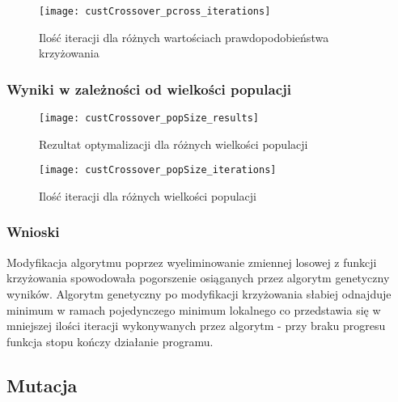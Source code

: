 \begin{figure}[H]
	\centering
	\texttt{[image: custCrossover\_pcross\_iterations]}
	\caption{Ilość iteracji dla różnych wartościach prawdopodobieństwa krzyżowania}
\end{figure}


\subsubsection{Wyniki w zależności od wielkości populacji}

\begin{figure}[H]
	\centering
	\texttt{[image: custCrossover\_popSize\_results]}
	\caption{Rezultat optymalizacji dla różnych wielkości populacji}

\end{figure}

\begin{figure}[H]
	\centering
	\texttt{[image: custCrossover\_popSize\_iterations]}
	\caption{Ilość iteracji dla różnych wielkości populacji}
\end{figure}

\subsubsection{Wnioski}

Modyfikacja algorytmu poprzez wyeliminowanie zmiennej losowej z funkcji krzyżowania spowodowała pogorszenie osiąganych przez algorytm genetyczny wyników. Algorytm genetyczny po modyfikacji krzyżowania słabiej odnajduje minimum w ramach pojedynczego minimum lokalnego co przedstawia się w mniejszej ilości iteracji wykonywanych przez algorytm - przy braku progresu funkcja stopu kończy działanie programu.

\subsection{Mutacja}